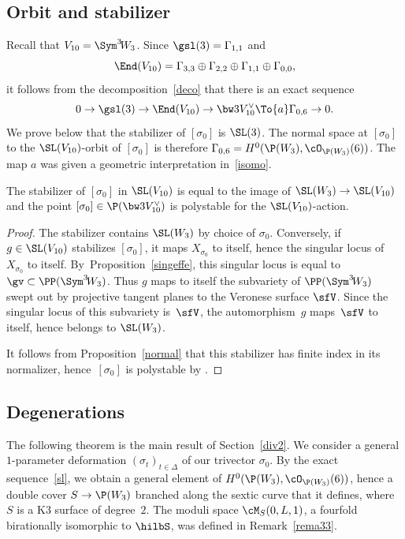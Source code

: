 \subsection{Orbit and stabilizer} \label{sect74}
Recall that $V_{10}= \Sym^3\! W_3$.
Since $\gsl(3)=\Gamma_{1,1} $ and
\[
\End(V_{10} )=\Gamma_{3,3} \oplus \Gamma_{2,2}\oplus \Gamma_{1,1}\oplus \Gamma_{0,0}
,
\]
it follows from the decomposition~\eqref{deco} that
there is an exact sequence
\begin{equation}\label{sl}
0\to \gsl(3)\to \End(V_{10})\to \bw3V_{10}^\vee \To{a} \Gamma_{0,6}\to 0.
\end{equation}
We prove below that the stabilizer of $[\sigma_0]$ is $\SL(3)$. The normal space at $[\sigma_0]$ to the $\SL(V_{10})$-orbit of $[\sigma_0]$ is therefore $ \Gamma_{0,6}=H^0(\P(W_3),\cO_{\P(W_3)}(6))$. The map $a$ was given a geometric interpretation in~\eqref{isomo}.

\begin{prop}\label{stabver}
The stabilizer of $[\sigma_0]$ in $\SL(V_{10})$ is equal to the image of $\SL(W_3)\to \SL(V_{10})$ and the point
$[\sigma_0]\in \P(\bw3V_{10}^\vee)$ is polystable for the $\SL(V_{10})$-action.
\end{prop}

\begin{proof}
The stabilizer contains $\SL(W_3)$ by choice of $\sigma_0$. Conversely, if $g\in\SL(V_{10})$ stabilizes $[\sigma_0]$, it maps $X_{\sigma_0}$ to itself, hence the singular locus of $X_{\sigma_0}$ to itself. By~Proposition~\ref{singeffe}, this singular locus is equal to $\gv\subset\PP(\Sym^3\! W_3)$. Thus $g$ maps to itself the subvariety of $\PP(\Sym^3\! W_3)$ swept out by projective tangent planes to the Veronese surface $\sfV$. Since the singular locus of this subvariety is~$\sfV$, the automorphism~$g$ maps~$\sfV$ to itself, hence belongs to $\SL(W_3)$.

It follows from Proposition~\ref{normal} that this stabilizer has finite index in its normalizer, hence~$[\sigma_0]$ is polystable by \cite[Cor.\,3]{luna}.
\end{proof}

\subsection{Degenerations}\label{dimodeg2}

The following theorem is the main result of Section~\ref{div2}. We consider a general $1$-parameter deformation $(\sigma_t)_{t\in \Delta}$ of our trivector $\sigma_0$. By the exact sequence~\eqref{sl}, we obtain a general element of $H^0(\P(W_3),\cO_{\P(W_3)}(6))$, hence a double cover $S\to \P(W_3)$ branched along the sextic curve that it defines, where $S$ is a K3 surface of degree~$2$. The moduli space $\cM_S(0,L,1)$, a \hk fourfold birationally isomorphic to $\hilbS$, was defined in Remark~\ref{rema33}.


